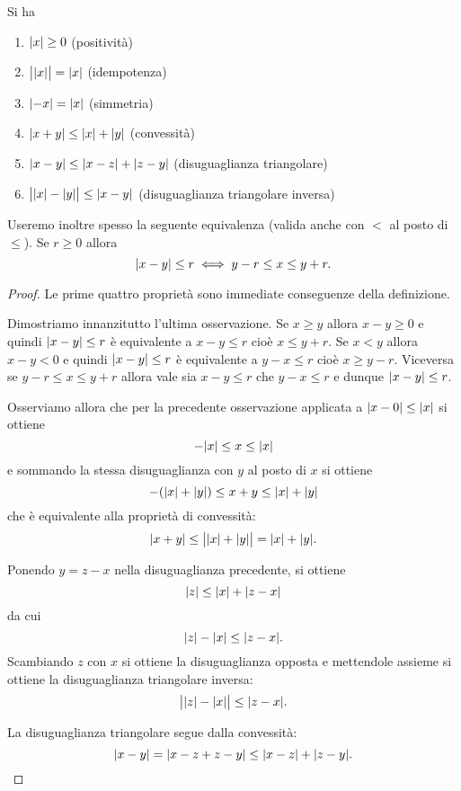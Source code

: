   \begin{proposition}
  \mymark{**}
  Si ha
  \begin{enumerate}
  \item ${\left|x\right|}\ge 0$ (positività)
  \item $\big\lvert{\left|x\right|}\big\rvert = {\left|x\right|}$ (idempotenza)
  \item ${\left|-x\right|} = {\left|x\right|}$ (simmetria)
  \item ${\left|x+y\right|} \le {\left|x\right|} + {\left|y\right|}$ (convessità)
  \item ${\left|x-y\right|} \le {\left|x-z\right|} + {\left|z-y\right|}$ (disuguaglianza triangolare)
  \item $\big\lvert{\left|x\right|}-{\left|y\right|}\big\rvert \le {\left|x-y\right|}$ (disuguaglianza triangolare inversa)
  \end{enumerate}
  Useremo inoltre spesso la seguente equivalenza (valida
  anche con $<$ al posto di $\le$). Se $r\ge 0$ allora
  \[
   {\left|x-y\right|} \le r
   \iff
   y - r \le x \le y + r.
  \]
  \end{proposition}
  \begin{proof}
  \mymark{*}
  Le prime quattro proprietà sono immediate conseguenze della definizione.
  
  Dimostriamo innanzitutto l'ultima osservazione.
  Se $x\ge y$ allora $x-y\ge 0$ e quindi ${\left|x-y\right|} \le r$ è
  equivalente a $x-y\le r$ cioè $x\le y+r$.
  Se $x<y$ allora $x-y<0$ e quindi ${\left|x-y\right|} \le r$ è
  equivalente a $y-x \le r$ cioè $x\ge y-r$.
  Viceversa se $y-r \le x \le y+r$ allora vale sia $x-y \le r$ che $y-x \le r$ e dunque ${\left|x-y\right|}\le r$.
  
  Osserviamo allora che per la precedente osservazione applicata
  a ${\left|x-0\right|} \le {\left|x\right|}$ si ottiene
  \[
    -{\left|x\right|} \le x \le {\left|x\right|}
  \]
  e sommando la stessa disuguaglianza con $y$ al posto di $x$ si
  ottiene
  \[
    -({\left|x\right|} + {\left|y\right|}) \le x + y \le {\left|x\right|} + {\left|y\right|}
  \]
  che è equivalente alla proprietà di convessità:
  \[
    {\left|x+y\right|} \le \big\lvert{\left|x\right|} + {\left|y\right|}\big\rvert = {\left|x\right|} + {\left|y\right|}.
  \]
  
  Ponendo $y=z-x$ nella disuguaglianza precedente, si ottiene
  \[
    {\left|z\right|} \le {\left|x\right|} + {\left|z-x\right|}
  \]
  da cui
  \[
    {\left|z\right|} - {\left|x\right|} \le {\left|z-x\right|}.
  \]
  Scambiando $z$ con $x$ si ottiene la disuguaglianza opposta
  e mettendole assieme si ottiene
  la disuguaglianza triangolare inversa:
  \[
  \big\lvert {\left|z\right|}-{\left|x\right|} \big\rvert  \le {\left|z-x\right|}.
  \]
  
  La disuguaglianza triangolare segue dalla convessità:
  \[
   {\left|x-y\right|} = {\left|x-z + z-y\right|} \le {\left|x-z\right|} + {\left|z-y\right|}.
  \]
  \end{proof}
  
